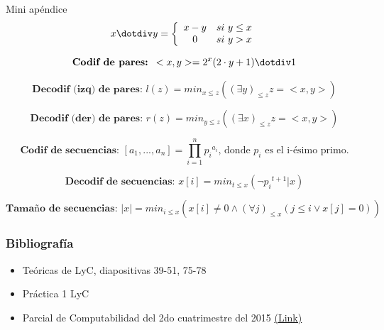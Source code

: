 \documentclass[10pt]{beamer}
\begin{document}

\begin{frame}{Mini apéndice}
	$$x \dotdiv y = \left\{
    \begin{array}{c l}
     x-y    &si\ y\leq x \\
	 0    &si\ y > x     
    \end{array}
    \right.
    $$
    
    $$\textbf{Codif de pares: }<x,y> = 2^x (2 \cdot y +1) \dotdiv 1$$
    
    $$\textbf{Decodif (izq) de pares: }l(z) = min_{x\leq z} ((\exists y)_{\leq z} z = <x,y>)$$
    
    $$\textbf{Decodif (der) de pares: }r(z) = min_{y\leq z} ((\exists x)_{\leq z} z = <x,y>)$$
    
    $$\textbf{Codif de secuencias: }[a_1,...,a_n] = \prod_{i=1}^n {p_i}^{a_i}\text{, donde }p_i\text{ es el i-ésimo primo.}$$
    
	    $$\textbf{Decodif de secuencias: }x[i]=min_{t\leq x}(\neg{p_i}^{t+1} | x)$$

$$\textbf{Tamaño de secuencias: }|x| = min_{i\leq x} (x[i] \neq 0 \land (\forall j)_{\leq x} (j\leq i \lor x[j] = 0))$$
\end{frame}

\begin{frame}
\frametitle{Bibliografía}

\begin{itemize}
	\item Teóricas de LyC, diapositivas 39-51, 75-78
	\item Práctica 1 LyC
	\item Parcial de Computabilidad del 2do cuatrimestre del 2015 \href{http://www.cubawiki.com.ar/images/1/13/LogicaYcomputabilidad_1p_2c2015.pdf}{(Link)}
	
\end{itemize}

\end{frame}




%
%
%
%



\end{document}

